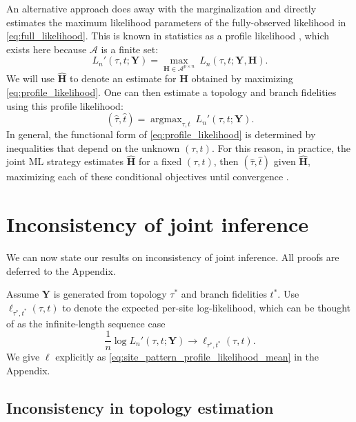 \documentclass{article}
\newcommand{\alphabet}{\mathcal{A}}
\newcommand{\fullAlignment}{\mathbf{Y}}
\newcommand{\fullAncestralStates}{\mathbf{H}}
\newcommand{\nCols}{n}
\newcommand{\nAncestralStateRows}{p}
\DeclareMathOperator*{\argmax}{argmax}
\begin{document}
An alternative approach \cite{Sagulenko2017-jo} does away with the marginalization and directly estimates the maximum likelihood parameters of the fully-observed likelihood in \eqref{eq:full_likelihood}.
This is known in statistics as a profile likelihood \cite{Murphy2000-ry}, which exists here because $\alphabet$ is a finite set:
\begin{equation}
\label{eq:profile_likelihood}
L_\nCols'(\tau, t; \fullAlignment) = \max_{\fullAncestralStates\in\alphabet^{\nAncestralStateRows\times\nCols}} \ L_\nCols(\tau, t; \fullAlignment, \fullAncestralStates).
\end{equation}
We will use $\hat{\fullAncestralStates}$ to denote an estimate for $\fullAncestralStates$ obtained by maximizing \eqref{eq:profile_likelihood}.
One can then estimate a topology and branch fidelities using this profile likelihood:
\begin{equation}
\label{eq:profile_likelihood_topology_bl}
(\hat{\tau}, \hat{t}) = \argmax_{\tau, t} \ L_\nCols'(\tau, t; \fullAlignment).
\end{equation}
In general, the functional form of \eqref{eq:profile_likelihood} is determined by inequalities that depend on the unknown $(\tau,t)$.
For this reason, in practice, the joint ML strategy estimates $\hat{\fullAncestralStates}$ for a fixed $(\tau,t)$, then $(\hat{\tau},\hat{t})$ given $\hat{\fullAncestralStates}$, maximizing each of these conditional objectives until convergence \cite{Sagulenko2017-jo}.


\section*{Inconsistency of joint inference}

We can now state our results on inconsistency of joint inference.
All proofs are deferred to the Appendix.

Assume $\fullAlignment$ is generated from topology $\tau^*$ and branch fidelities $t^*$.
Use $\ell_{\tau^*,t^*}(\tau, t)$ to denote the expected per-site log-likelihood, which can be thought of as the infinite-length sequence case
$$
\frac{1}{n}\log L_\nCols'(\tau, t; \fullAlignment) \rightarrow \ell_{\tau^*,t^*}(\tau, t).
$$
We give $\ell$ explicitly as \eqref{eq:site_pattern_profile_likelihood_mean} in the Appendix.

\subsection*{Inconsistency in topology estimation}
\end{document}
